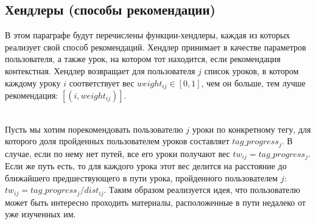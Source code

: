 \documentclass[12pt]{article}
\begin{document}
\subsection{Хендлеры (способы рекомендации)}
\indent В этом параграфе будут перечислены функции-хендлеры, каждая из которых реализует свой способ рекомендаций. Хендлер принимает в качестве параметров пользователя, а также урок, на котором тот находится, если рекомендация контекстная. Хендлер возвращает для пользователя $j$ список уроков, в котором каждому уроку $i$ соответствует вес $weight_{ij} \in [0,1]$, чем он больше, тем лучше рекомендация:  $[(i, weight_{ij})]$. 

\\\indent Пусть мы хотим порекомендовать пользователю $j$ уроки по конкретному тегу, для которого доля пройденных пользователем уроков составляет $tag\_progress_j$. В случае, если по нему нет путей, все его уроки получают вес  $tw_{ij} =tag\_progress_j$. Если же путь есть, то для каждого урока этот вес делится на расстояние до ближайшего предшествующего в пути урока, пройденного пользователем $j$: $tw_{ij} = tag\_progress_j / dist_{ij}$. Таким образом реализуется идея, что пользователю может быть интересно проходить материалы, расположенные в пути недалеко от уже изученных им.
\end{document}
